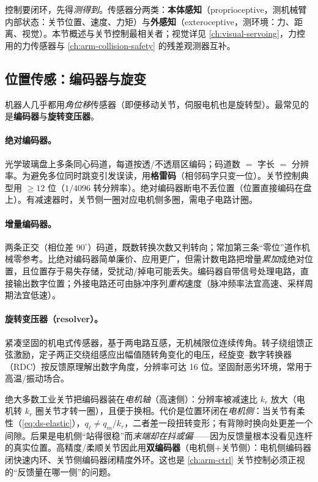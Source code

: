 控制要闭环，先得\emph{测得到}。传感器分两类：\textbf{本体感知}（proprioceptive，测机械臂内部状态：关节位置、速度、力矩）与\textbf{外感知}（exteroceptive，测环境：力、距离、视觉）。本节概述与关节控制最相关者；视觉详见 \cref{ch:visual-servoing}，力控用的力传感器与 \cref{ch:arm-collision-safety} 的残差观测器互补。

\subsection{位置传感：编码器与旋变}
\label{sec:ds-encoders}

机器人几乎都用\emph{角位移}传感器（即便移动关节，伺服电机也是旋转型）。最常见的是\textbf{编码器}与\textbf{旋转变压器}。

\paragraph{绝对编码器。}\;光学玻璃盘上多条同心码道，每道按透/不透扇区编码；码道数 $=$ 字长 $=$ 分辨率。为避免多位同时跳变引发误读，用\textbf{格雷码}（相邻码字只变一位）。关节控制典型用 $\ge12$ 位（$1/4096$ 转分辨率）。绝对编码器断电不丢位置（位置直接编码在盘上）。有减速器时，关节侧一圈对应电机侧多圈，需电子电路计圈。

\paragraph{增量编码器。}\;两条正交（相位差 $90^\circ$）码道，既数转换次数又判转向；常加第三条“零位”道作机械零参考。比绝对编码器简单廉价、应用更广，但需计数电路把增量\emph{累加}成绝对位置，且位置存于易失存储，受扰动/掉电可能丢失。编码器自带信号处理电路，直接输出数字位置；外接电路还可由脉冲序列\emph{重构}速度（脉冲频率法宜高速、采样周期法宜低速）。

\paragraph{旋转变压器（resolver）。}\;紧凑坚固的机电式传感器，基于两电路互感，无机械限位连续传角。转子绕组馈正弦激励，定子两正交绕组感应出幅值随转角变化的电压，经旋变--数字转换器（RDC）按反馈原理解出数字角度，分辨率可达 16 位。坚固耐恶劣环境，常用于高温/振动场合。

\begin{pitfall}
\label{pit:ds-motor-side}
绝大多数工业关节把编码器装在\emph{电机轴}（高速侧）：分辨率被减速比 $k_r$ 放大（电机转 $k_r$ 圈关节才转一圈），且便于换相。代价是位置环闭在\emph{电机侧}：当关节有柔性（\cref{eq:ds-elastic}），$q_\ell\ne q_m/k_r$，二者差一段扭转变形；有背隙时换向处更差一个间隙。后果是电机侧“站得很稳”而\emph{末端却在抖或偏}——因为反馈量根本没看见连杆的真实位置。高精度/柔顺关节因此用\textbf{双编码器}（电机侧$+$关节侧）：电机侧编码器闭快速内环、关节侧编码器闭精度外环。这也是 \cref{ch:arm-ctrl} 关节控制必须正视的“反馈量在哪一侧”的问题。
\end{pitfall}


